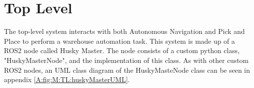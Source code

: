 


\section{Top Level} \label{sec:M:TopLevel}

The top-level system interacts with both Autonomous Navigation and Pick and Place to perform a warehouse automation task. This system is made up of a ROS2 node called Husky Master. The node consists of a custom python class, "HuskyMasterNode", and the implementation of this class. As with other custom ROS2 nodes, an UML class diagram of the HuskyMasteNode class can be seen in appendix \ref{A:fig:M:TL:huskyMasterUML}.

